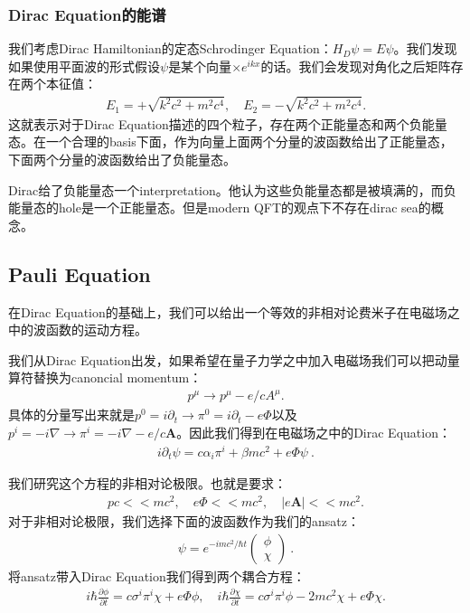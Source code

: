 \subsubsection{Dirac Equation的能谱}


我们考虑Dirac Hamiltonian的定态Schrodinger Equation：$ H_D \psi = E \psi
$。我们发现如果使用平面波的形式假设$ \psi $是某个向量$ \times e^{i kx} $的话。我们会发现对角化之后矩阵存在两个本征值：
\begin{align}
  E_1=+\sqrt{k^2c^2+m^2c^4},\quad E_2=-\sqrt{k^2c^2+m^2c^4}.
\end{align}
这就表示对于Dirac
Equation描述的四个粒子，存在两个正能量态和两个负能量态。在一个合理的basis下面，作为向量上面两个分量的波函数给出了正能量态，下面两个分量的波函数给出了负能量态。

\bigskip
{}

Dirac给了负能量态一个interpretation。他认为这些负能量态都是被填满的，而负能量态的hole是一个正能量态。但是modern
QFT的观点下不存在dirac sea的概念。

\subsection{Pauli Equation}

在Dirac Equation的基础上，我们可以给出一个等效的非相对论费米子在电磁场之中的波函数的运动方程。

\bigskip
{}

我们从Dirac Equation出发，如果希望在量子力学之中加入电磁场我们可以把动量算符替换为canoncial momentum：
\begin{align}
  p^\mu \rightarrow p^\mu - e/c A^\mu.
\end{align}
具体的分量写出来就是$  p^0 = i \partial_t \rightarrow \pi^0 = i \partial_t - e
\Phi $以及$ p^i = -i \nabla \rightarrow \pi^i =  -i\nabla - e/c
\mathbf{A} $。因此我们得到在电磁场之中的Dirac Equation：
\begin{align}
  i \partial_t \psi = c \alpha_i \pi^i + \beta m c^2 + e \Phi \psi\mathrm{~.}
\end{align}

\bigskip
{}

我们研究这个方程的非相对论极限。也就是要求：
\begin{align}
  pc<< mc^2,\quad e\Phi << mc^2,\quad|e\mathbf{A}| << mc^2.
\end{align}
对于非相对论极限，我们选择下面的波函数作为我们的ansatz：
\begin{align}
  \psi = e^{-i mc^2/\hbar t}
  \begin{pmatrix}\phi\\ \chi
  \end{pmatrix}\mathrm{~.}
\end{align}
将ansatz带入Dirac Equation我们得到两个耦合方程：
\begin{align}
  i \hbar \frac{\partial \phi}{\partial t} = c \sigma^i \pi^i \chi +
  e \Phi \phi, \quad i \hbar \frac{\partial \chi}{\partial t} = c
  \sigma^i \pi^i \phi - 2 m c^2 \chi + e \Phi \chi.
\end{align}

